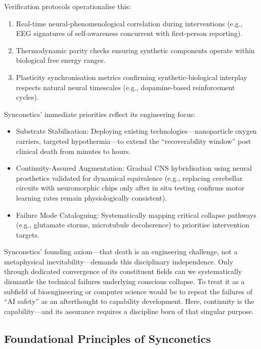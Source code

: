 \documentclass[10pt]{article}
\begin{document}
\begin{sloppypar}
  Verification protocols operationalise this:

  \begin{enumerate}
    \item Real-time neural-phenomenological correlation during interventions (e.g., EEG signatures of self-awareness concurrent with first-person reporting).
    \item Thermodynamic parity checks ensuring synthetic components operate within biological free energy ranges.
    \item Plasticity synchronisation metrics confirming synthetic-biological interplay respects natural neural timescales (e.g., dopamine-based reinforcement cycles).
  \end{enumerate}

  Synconetics’ immediate priorities reflect its engineering focus:

  \begin{itemize}
    \item Substrate Stabilisation: Deploying existing technologies—nanoparticle oxygen carriers, targeted hypothermia—to extend the “recoverability window” post clinical death from minutes to hours.
    \item Continuity-Assured Augmentation: Gradual CNS hybridisation using neural prosthetics validated for dynamical equivalence (e.g., replacing cerebellar circuits with neuromorphic chips only after in situ testing confirms motor learning rates remain physiologically consistent).
    \item Failure Mode Cataloguing: Systematically mapping critical collapse pathways (e.g., glutamate storms, microtubule decoherence) to prioritise intervention targets.
  \end{itemize}

  Synconetics’ founding axiom—that death is an engineering challenge, not a metaphysical inevitability—demands this disciplinary independence. Only through dedicated convergence of its constituent fields can we systematically dismantle the technical failures underlying conscious collapse. To treat it as a subfield of bioengineering or computer science would be to repeat the failures of “AI safety” as an afterthought to capability development. Here, continuity is the capability—and its assurance requires a discipline born of that singular purpose.

  \subsection{Foundational Principles of Synconetics}
  \label{sec:foundational-principles}


\end{sloppypar}
\end{document}
